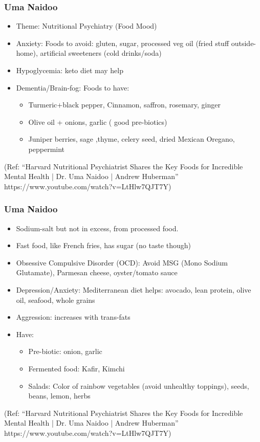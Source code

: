 \begin{frame}[fragile]\frametitle{Uma Naidoo}


	\begin{itemize}
\item  Theme: Nutritional Psychiatry (Food Mood)
\item  Anxiety: Foods to avoid: gluten, sugar, processed veg oil (fried stuff outside-home), artificial sweeteners (cold drinks/soda)
\item  Hypoglycemia: keto diet may help
\item  Dementia/Brain-fog: Foods to have: 
	\begin{itemize}

	\item  Turmeric+black pepper, Cinnamon, saffron, rosemary, ginger
	\item  Olive oil + onions, garlic ( good pre-biotics)
	\item  Juniper berries, sage ,thyme, celery seed, dried Mexican Oregano, peppermint
	\end{itemize}


\end{itemize}

{\tiny (Ref: ``Harvard Nutritional Psychiatrist Shares the Key Foods for Incredible Mental Health | Dr. Uma Naidoo | Andrew Huberman'' https://www.youtube.com/watch?v=LtHlw7QJT7Y)}

\end{frame}


\begin{frame}[fragile]\frametitle{Uma Naidoo}

	\begin{itemize}
\item  Sodium-salt but not in excess, from processed food.
\item  Fast food, like French fries, has sugar (no taste though)
\item  Obsessive Compulsive Disorder (OCD): Avoid MSG (Mono Sodium Glutamate), Parmesan cheese, oyster/tomato sauce
\item  Depression/Anxiety: Mediterranean diet helps: avocado, lean protein, olive oil, seafood, whole grains
\item  Aggression: increases with trans-fats
\item  Have:
	\begin{itemize}

	\item  Pre-biotic: onion, garlic
	\item  Fermented food: Kafir, Kimchi
	\item  Salads: Color of rainbow vegetables (avoid unhealthy toppings), seeds, beans, lemon, herbs
	\end{itemize}

\end{itemize}


{\tiny (Ref: ``Harvard Nutritional Psychiatrist Shares the Key Foods for Incredible Mental Health | Dr. Uma Naidoo | Andrew Huberman'' https://www.youtube.com/watch?v=LtHlw7QJT7Y)}

\end{frame}

